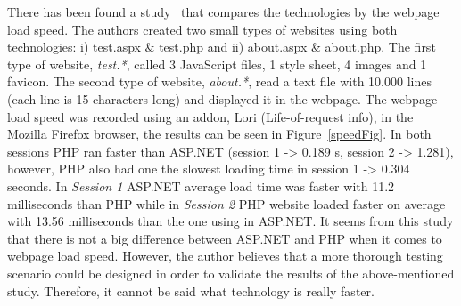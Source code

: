 \documentclass[11]{article}
\begin{document}
	\indent
	There has been found  a study~\citep{mirzoev2014webpage} that compares the technologies by the webpage load speed. The authors created two small types of websites using both technologies: i) test.aspx \& test.php and ii) about.aspx \& about.php. The first type of website, \textit{test.*}, called 3 JavaScript files, 1 style sheet, 4 images and 1 favicon. The second type of website, \textit{about.*}, read a text file with 10.000 lines (each line is 15 characters long) and displayed it in the webpage. The webpage load speed was recorded using an addon, Lori (Life-of-request info), in the Mozilla Firefox browser, the results can be seen in Figure~\ref{speedFig}. In both sessions PHP ran faster than ASP.NET (session 1 -> 0.189 s, session 2 -> 1.281), however, PHP also had one the slowest loading time in session 1 -> 0.304 seconds. In \textit{Session 1} ASP.NET average load time was faster with 11.2 milliseconds than PHP while in \textit{Session 2} PHP website loaded faster on average with 13.56 milliseconds than the one using in ASP.NET. It seems from this study that there is not a big difference between ASP.NET and PHP when it comes to webpage load speed. However, the author believes that a more thorough testing scenario could be designed in order to validate the results of the above-mentioned study. Therefore, it cannot be said what technology is really faster. 
\end{document}
